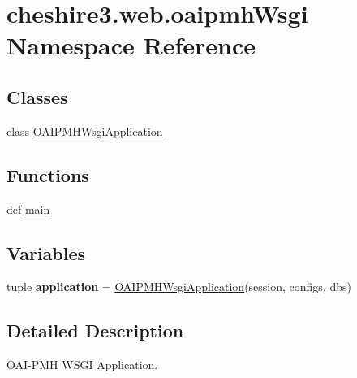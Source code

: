 \hypertarget{namespacecheshire3_1_1web_1_1oaipmh_wsgi}{\section{cheshire3.\-web.\-oaipmh\-Wsgi Namespace Reference}
\label{namespacecheshire3_1_1web_1_1oaipmh_wsgi}
}
\subsection*{Classes}
\begin{DoxyCompactItemize}
\item 
class \hyperlink{classcheshire3_1_1web_1_1oaipmh_wsgi_1_1_o_a_i_p_m_h_wsgi_application}{O\-A\-I\-P\-M\-H\-Wsgi\-Application}
\end{DoxyCompactItemize}
\subsection*{Functions}
\begin{DoxyCompactItemize}
\item 
def \hyperlink{namespacecheshire3_1_1web_1_1oaipmh_wsgi_a452202bb3648a8654fa33e8c2acca005}{main}
\end{DoxyCompactItemize}
\subsection*{Variables}
\begin{DoxyCompactItemize}
\item 
\hypertarget{namespacecheshire3_1_1web_1_1oaipmh_wsgi_af0dc881bc01434809387f6233738905a}{tuple {\bfseries application} = \hyperlink{classcheshire3_1_1web_1_1oaipmh_wsgi_1_1_o_a_i_p_m_h_wsgi_application}{O\-A\-I\-P\-M\-H\-Wsgi\-Application}(session, configs, dbs)}\label{namespacecheshire3_1_1web_1_1oaipmh_wsgi_af0dc881bc01434809387f6233738905a}

\end{DoxyCompactItemize}


\subsection{Detailed Description}
\begin{DoxyVerb}OAI-PMH WSGI Application.\end{DoxyVerb}
 

